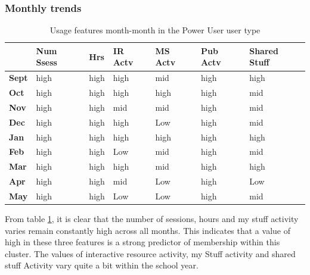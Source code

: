 \documentclass{acm_proc_article-sp}
\begin{document}
\subsubsection{Monthly trends}
\begin{table}
\caption{Usage features month-month in the Power User user type}
\label{cluster1month}
\begin{tabular}{|p{0.6cm}|p{0.6cm}|p{0.6cm}|p{0.6cm}|p{0.6cm}|p{0.8cm}|p{0.8cm}|}
 & Num Ssess & Hrs & IR Actv & MS Actv & Pub Actv & Shared Stuff \\ \hline
\textbf{Sept} & high                                   & high  & high        & mid             & high           & high                \\ \hline
\textbf{Oct}   & high                                   & high  & high        & high            & high           & mid                 \\ \hline
\textbf{Nov}  & high                                   & high  & mid         & mid             & high           & mid                 \\ \hline
\textbf{Dec}  & high                                   & high  & high        & Low             & high           & mid                 \\ \hline
\textbf{Jan}   & high                                   & high  & high        & high            & high           & high                \\ \hline
\textbf{Feb}  & high                                   & high  & Low         & mid             & high           & mid                 \\ \hline
\textbf{Mar}     & high                                   & high  & high        & mid             & high           & high                \\ \hline
\textbf{Apr}     & high                                   & high  & mid         & Low             & high           & Low                 \\ \hline
\textbf{May}       & high                                   & high  & Low         & Low             & high           & mid                
\end{tabular}
\end{table}
From table \ref{cluster1month}, it is clear that the number of sessions, hours and my stuff activity varies remain constantly high across all months. This indicates that a value of high in these three features is a strong predictor of membership within this cluster.  The values of interactive resource activity, my Stuff activity and shared stuff Activity vary quite a bit within the school year.
\end{document}
